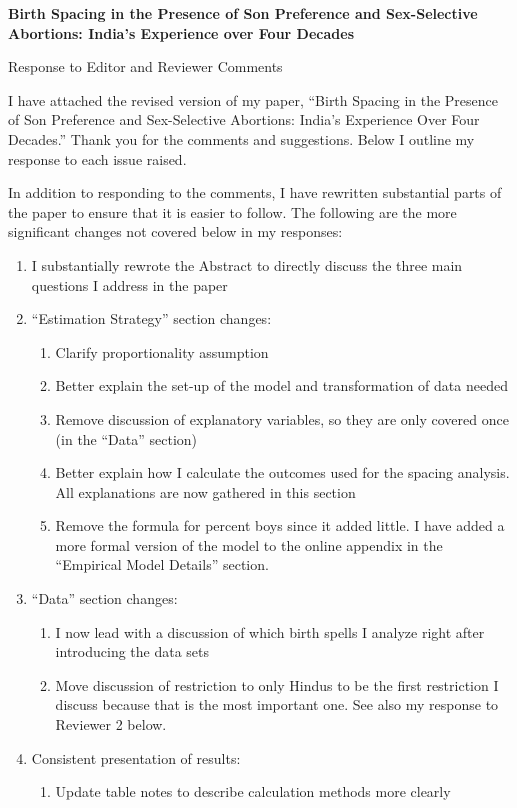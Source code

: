 \documentclass[letterpaper,12pt]{article}
\title{} \author{}
\begin{document}
\begin{center} \textbf{\large Birth Spacing in the Presence of Son
Preference and 
Sex-Selective Abortions: India's Experience over Four Decades}
\end{center}

\begin{center} Response to Editor and Reviewer Comments \end{center}

\noindent I have attached the revised version of my paper,
``Birth Spacing in the Presence of Son Preference and Sex-Selective
Abortions: India's Experience Over Four Decades.''
Thank you for the comments and suggestions. 
Below I outline my response to each issue raised.


In addition to responding to the comments, I have rewritten substantial parts of the paper to ensure 
that it is easier to follow. 
The following are the more significant changes not covered below in my responses:
\begin{enumerate}
    \item I substantially rewrote the Abstract to directly discuss the three main 
    questions I address in the paper
	\item ``Estimation Strategy'' section changes:
	\begin{enumerate}
		\item Clarify proportionality assumption
		\item Better explain the set-up of the model and transformation of data needed
		\item Remove discussion of explanatory variables, so they are
		only covered once (in the ``Data'' section)
		\item Better explain how I calculate the outcomes used for the spacing analysis. 
		All explanations are now gathered in this section
		\item Remove the formula for percent boys since it added little. 
		I have added a more formal version of the model to the online appendix in the
		``Empirical Model Details'' section.
	\end{enumerate}
	\item ``Data'' section changes:
	\begin{enumerate}
		\item I now lead with a discussion of which birth spells I analyze right after 
		introducing the data sets
		\item Move discussion of restriction to only Hindus to be the first restriction I 
		discuss because that is the most important one. 
		See also my response to Reviewer 2 below.
	\end{enumerate}
	\item Consistent presentation of results:
	\begin{enumerate}
		\item Update table notes to describe calculation methods more clearly
	\end{enumerate}
\end{enumerate}
\end{document}
